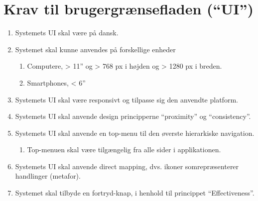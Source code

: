 \section{Krav til brugergrænsefladen (“UI”)}
\begin{enumerate}
	\item Systemets UI skal være på dansk.
	\item Systemet skal kunne anvendes på forskellige enheder
	\begin{enumerate}
		\item Computere, > 11” og > 768 px i højden og > 1280 px i breden.
		\item Smartphones, < 6”
	\end{enumerate}
	\item Systemets UI skal være responsivt og tilpasse sig den anvendte platform.
	\item Systemets UI skal anvende design principperne “proximity” og “consistency”.
	\item Systemets UI skal anvende en top-menu til den øverste hierarkiske navigation. 
	\begin{enumerate}	
		\item Top-menuen skal være tilgængelig fra alle sider i applikationen. 
	\end{enumerate}
	\item Systemets UI skal anvende direct mapping, dvs. ikoner somrepræsenterer handlinger (metafor).
	\item Systemet skal tilbyde en fortryd-knap, i henhold til princippet “Effectiveness”.
\end{enumerate}